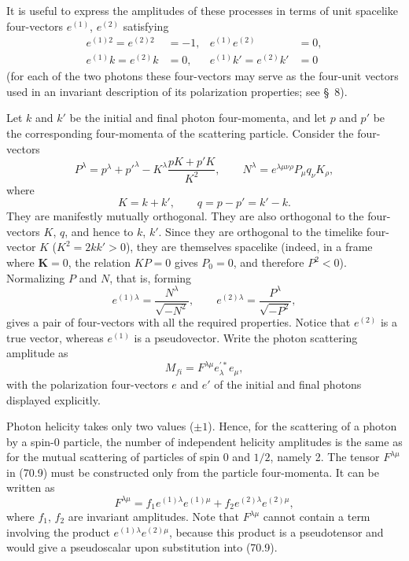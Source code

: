 It is useful to express the amplitudes of these processes in terms of unit spacelike four-vectors $e^{(1)}$, $e^{(2)}$ satisfying
\begin{equation}
\begin{aligned}
e^{(1)2}=e^{(2)2}&=-1,&e^{(1)}e^{(2)}&=0,\\
e^{(1)}k=e^{(2)}k&=0,&e^{(1)}k'=e^{(2)}k'&=0
\end{aligned}
\tag{70.6}
\end{equation}
(for each of the two photons these four-vectors may serve as the four-unit vectors used in an invariant description of its polarization properties; see \S~8).

Let $k$ and $k'$ be the initial and final photon four-momenta, and let $p$ and $p'$ be the corresponding four-momenta of the scattering particle. Consider the four-vectors
\begin{equation}
P^\lambda=p^\lambda+p'^\lambda
-K^\lambda\frac{pK+p'K}{K^2},
\qquad
N^\lambda=e^{\lambda\mu\nu\rho}P_\mu q_\nu K_\rho,
\tag{70.7}
\end{equation}
where
\[
K=k+k',\qquad q=p-p'=k'-k.
\]
They are manifestly mutually orthogonal. They are also orthogonal to the four-vectors $K$, $q$, and hence to $k$, $k'$. Since they are orthogonal to the timelike four-vector $K$ ($K^2=2kk'>0$), they are themselves spacelike (indeed, in a frame where $\mathbf K=0$, the relation $KP=0$ gives $P_0=0$, and therefore
$P^2<0$). Normalizing $P$ and $N$, that is, forming
\begin{equation}
e^{(1)\lambda}=\frac{N^\lambda}{\sqrt{-N^2}},
\qquad
e^{(2)\lambda}=\frac{P^\lambda}{\sqrt{-P^2}},
\tag{70.8}
\end{equation}
gives a pair of four-vectors with all the required properties. Notice that $e^{(2)}$ is a true vector, whereas $e^{(1)}$ is a pseudovector. Write the photon scattering amplitude as
\begin{equation}
M_{fi}=F^{\lambda\mu}e_\lambda^{\prime *}e_\mu,
\tag{70.9}
\end{equation}
with the polarization four-vectors $e$ and $e'$ of the initial and final photons displayed explicitly.

Photon helicity takes only two values ($\pm1$). Hence, for the scattering of a photon by a spin-0 particle, the number of independent helicity amplitudes is the same as for the mutual scattering of particles of spin 0 and $1/2$, namely 2. The tensor $F^{\lambda\mu}$ in (70.9) must be constructed only from the particle four-momenta. It can be written as
\begin{equation}
F^{\lambda\mu}
=f_1e^{(1)\lambda}e^{(1)\mu}
+f_2e^{(2)\lambda}e^{(2)\mu},
\tag{70.10}
\end{equation}
where $f_1$, $f_2$ are invariant amplitudes. Note that $F^{\lambda\mu}$ cannot contain a term involving the product $e^{(1)\lambda}e^{(2)\mu}$, because this product is a pseudotensor and would give a pseudoscalar upon substitution into (70.9).

